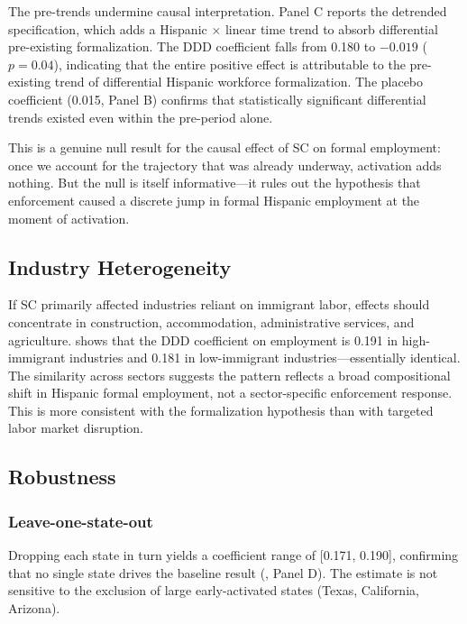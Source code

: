 \documentclass[12pt]{article}
\begin{document}
The pre-trends undermine causal interpretation. Panel C reports the detrended specification, which adds a Hispanic $\times$ linear time trend to absorb differential pre-existing formalization. The DDD coefficient falls from 0.180 to $-0.019$ ($p = 0.04$), indicating that the entire positive effect is attributable to the pre-existing trend of differential Hispanic workforce formalization. The placebo coefficient (0.015, Panel B) confirms that statistically significant differential trends existed even within the pre-period alone.

This is a genuine null result for the causal effect of SC on formal employment: once we account for the trajectory that was already underway, activation adds nothing. But the null is itself informative---it rules out the hypothesis that enforcement caused a discrete jump in formal Hispanic employment at the moment of activation.

\subsection{Industry Heterogeneity}



If SC primarily affected industries reliant on immigrant labor, effects should concentrate in construction, accommodation, administrative services, and agriculture.  shows that the DDD coefficient on employment is 0.191 in high-immigrant industries and 0.181 in low-immigrant industries---essentially identical. The similarity across sectors suggests the pattern reflects a broad compositional shift in Hispanic formal employment, not a sector-specific enforcement response. This is more consistent with the formalization hypothesis than with targeted labor market disruption.

\subsection{Robustness}



\subsubsection*{Leave-one-state-out} Dropping each state in turn yields a coefficient range of [0.171, 0.190], confirming that no single state drives the baseline result (, Panel D). The estimate is not sensitive to the exclusion of large early-activated states (Texas, California, Arizona).
\end{document}
